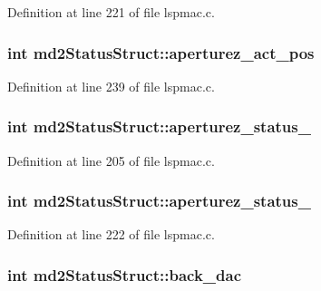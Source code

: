 Definition at line 221 of file lspmac.c.\hypertarget{structmd2StatusStruct_a62d584ce23cfd9aa626d3c03649b455c}{
\subsubsection[{aperturez\_\-act\_\-pos}]{\setlength{\rightskip}{0pt plus 5cm}int {\bf md2StatusStruct::aperturez\_\-act\_\-pos}}}
\label{structmd2StatusStruct_a62d584ce23cfd9aa626d3c03649b455c}


Definition at line 239 of file lspmac.c.\hypertarget{structmd2StatusStruct_a27880dd795e1ba4fea4870c64ee3aa84}{
\subsubsection[{aperturez\_\-status\_\-1}]{\setlength{\rightskip}{0pt plus 5cm}int {\bf md2StatusStruct::aperturez\_\-status\_}}}
\label{structmd2StatusStruct_a27880dd795e1ba4fea4870c64ee3aa84}


Definition at line 205 of file lspmac.c.\hypertarget{structmd2StatusStruct_ae407a99e428d9f4a7444a02c8bc3414e}{
\subsubsection[{aperturez\_\-status\_\-2}]{\setlength{\rightskip}{0pt plus 5cm}int {\bf md2StatusStruct::aperturez\_\-status\_}}}
\label{structmd2StatusStruct_ae407a99e428d9f4a7444a02c8bc3414e}


Definition at line 222 of file lspmac.c.\hypertarget{structmd2StatusStruct_a33ce490348c8de255cf49b96469d3d4e}{
\subsubsection[{back\_\-dac}]{\setlength{\rightskip}{0pt plus 5cm}int {\bf md2StatusStruct::back\_\-dac}}}
\label{structmd2StatusStruct_a33ce490348c8de255cf49b96469d3d4e}


